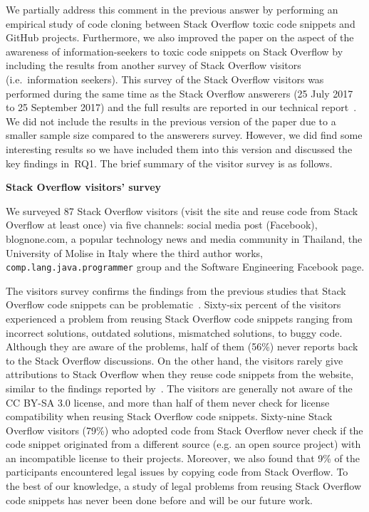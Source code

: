 \documentclass[a4paper,twoside,10pt]{reviewresponse}
\begin{document}
We partially address this comment in the previous answer by performing an empirical study of code cloning between Stack Overflow toxic code snippets and GitHub projects. Furthermore, we also improved the paper on the aspect of the awareness of information-seekers to toxic code snippets on Stack Overflow by including the results from another survey of Stack Overflow visitors (i.e.~information seekers). This survey of the Stack Overflow visitors was performed during the same time as the Stack Overflow answerers (25 July 2017 to 25 September 2017) and the full results are reported in our technical report~\citep{Ragkhitwetsagul_RN2017}. We did not include the results in the previous version of the paper due to a smaller sample size compared to the answerers survey. However, we did find some interesting results so we have included them into this version and discussed the key findings in~RQ1. The brief summary of the visitor survey is as follows.

\textbf{Stack Overflow visitors' survey}

We surveyed 87 Stack Overflow visitors (visit the site and reuse code from Stack Overflow at least once) via five channels: social media post (Facebook),
\textsf{blognone.com}, a popular technology news and media community in Thailand, the University of Molise in Italy where the third author works, \texttt{comp.lang.java.programmer} group and the Software Engineering
Facebook page.

The visitors survey confirms the findings from the previous studies that Stack
Overflow code snippets can be problematic~\citep{Zhang2018,Acar2016,An2017}. Sixty-six
percent of the visitors experienced a problem from reusing Stack Overflow code
snippets ranging from incorrect solutions, outdated solutions, mismatched
solutions, to buggy code. Although they are aware of the problems, half of them
(56\%) never reports back to the Stack Overflow discussions. On the other hand,
the visitors rarely give attributions to Stack Overflow when they reuse code
snippets from the website, similar to the findings reported
by~\cite{Baltes2017}. The visitors are generally not aware of the CC BY-SA 3.0
license, and more than half of them never check for license compatibility when
reusing Stack Overflow code snippets. 
Sixty-nine Stack Overflow visitors (79\%) who adopted code from Stack Overflow never 
check if the code snippet originated from a different source (e.g. an open source project) 
with an incompatible license to their projects.
Moreover, we also found that 9\% of the participants
encountered legal issues by copying code from Stack Overflow. To the best of our
knowledge, a study of legal problems from reusing Stack Overflow code snippets
has never been done before and will be our future work.
\end{document}
